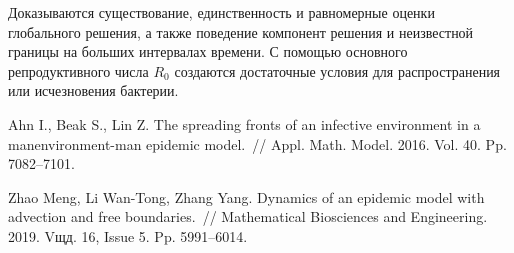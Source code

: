 Доказываются существование, единственность и равномерные оценки глобального решения, а также поведение компонент решения и неизвестной границы на больших интервалах времени. С помощью основного репродуктивного числа $R_{0}$ создаются достаточные условия для распространения или исчезновения бактерии.


%



\begin{thebibliography}{9} %
 Ahn I., Beak S.,   Lin Z. The spreading fronts of an infective environment in a manenvironment-man epidemic model.~// Appl. Math. Model. 2016. Vol. 40. Pp. 7082--7101.

 Zhao Meng, Li Wan-Tong, Zhang Yang. Dynamics of an epidemic model with advection and free boundaries.~// Mathematical Biosciences and Engineering. 2019. Vщд. 16, Issue 5. Pp. 5991--6014.%

\end{thebibliography}





%

